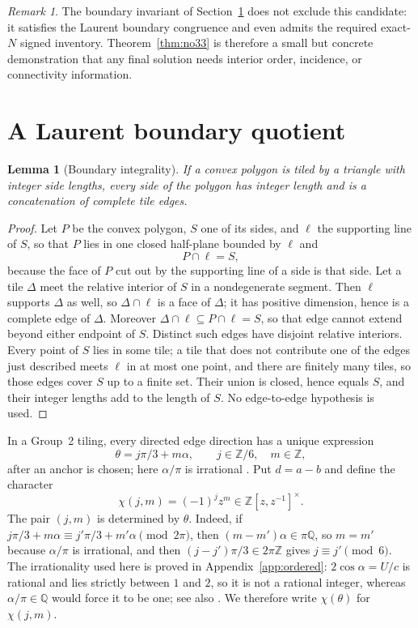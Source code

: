 \documentclass[11pt]{amsart}
\newtheorem{lemma}[theorem]{Lemma}
\theoremstyle{definition}
\theoremstyle{remark}
\newtheorem{remark}[theorem]{Remark}
\newcommand{\Z}{\mathbb Z}
\newcommand{\Q}{\mathbb Q}
\begin{document}
\begin{remark}
The boundary invariant of Section~\ref{sec:laurent} does not exclude this
candidate: it satisfies the Laurent boundary congruence and even
admits the required exact-$N$ signed inventory.  Theorem~\ref{thm:no33} is
therefore a small but concrete demonstration that any final solution needs
interior order, incidence, or connectivity information.
\end{remark}

\section{A Laurent boundary quotient}\label{sec:laurent}

\begin{lemma}[Boundary integrality]\label{lem:boundary-integrality}
If a convex polygon is tiled by a triangle with integer side lengths, every
side of the polygon has integer length and is a concatenation of complete
tile edges.
\end{lemma}

\begin{proof}
Let $P$ be the convex polygon, $S$ one of its sides, and $\ell$ the supporting
line of $S$, so that $P$ lies in one closed half-plane bounded by $\ell$ and
\[
                          P\cap\ell=S,
\]
because the face of $P$ cut out by the supporting line of a side is that side.
Let a tile $\Delta$ meet the relative interior of $S$ in a nondegenerate
segment.  Then $\ell$ supports $\Delta$ as well, so $\Delta\cap\ell$ is a face
of $\Delta$; it has positive dimension, hence is a complete edge of $\Delta$.
Moreover $\Delta\cap\ell\subseteq P\cap\ell=S$, so that edge cannot extend
beyond either endpoint of $S$.  Distinct such edges have disjoint relative
interiors.  Every point of $S$ lies in some tile; a tile that does not
contribute one of the edges just described meets $\ell$ in at most one point,
and there are finitely many tiles, so those edges cover $S$ up to a finite
set.  Their union is closed, hence equals $S$, and their integer lengths add to
the length of $S$.  No edge-to-edge hypothesis is used.
\end{proof}

In a Group~2 tiling, every directed edge direction has a unique expression
\[
             \theta=j\pi/3+m\alpha,\qquad j\in\Z/6,\quad m\in\Z,
\]
after an anchor is chosen; here $\alpha/\pi$ is irrational
\cite{BZRat}.  Put $d=a-b$ and define the character
\[
       \chi(j,m)=(-1)^jz^m\in\Z[z,z^{-1}]^\times.
\]
The pair $(j,m)$ is determined by $\theta$.  Indeed, if
$j\pi/3+m\alpha\equiv j'\pi/3+m'\alpha\pmod{2\pi}$, then
$(m-m')\alpha\in\pi\Q$, so $m=m'$ because $\alpha/\pi$ is irrational, and then
$(j-j')\pi/3\in2\pi\Z$ gives $j\equiv j'\pmod6$.  The irrationality used here
is proved in Appendix~\ref{app:ordered}: $2\cos\alpha=U/c$ is rational and
lies strictly between $1$ and $2$, so it is not a rational integer, whereas
$\alpha/\pi\in\Q$ would force it to be one; see also \cite{BZRat}.  We
therefore write $\chi(\theta)$ for $\chi(j,m)$.
\end{document}
